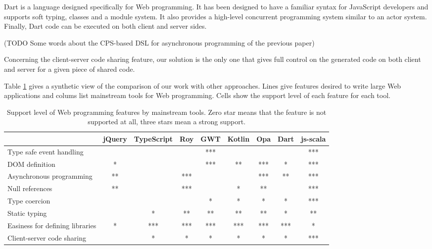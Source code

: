\documentclass[american,english,runningheads]{llncs}
\begin{document}
Dart is a language designed specifically for Web programming. It has been designed to have a familiar syntax for
JavaScript developers and supports soft typing, classes and a module system. It also provides a high-level concurrent
programming system similar to an actor system. Finally, Dart code can be executed on both client and server sides.

(TODO Some words about the CPS-based DSL for asynchronous programming of the previous paper)

Concerning the client-server code sharing feature, our solution is the only one that gives full control on the
generated code on both client and server for a given piece of shared code.

Table \ref{comparison} gives a synthetic view of the comparison of our work with other approaches. Lines give
features desired to write large Web applications and colums list mainstream tools for Web programming. Cells show the
support level of each feature for each tool.

\begin{table}
\centering
\begin{tabular}{| l | c | c | c | c | c | c | c | c |}
\hline
& jQuery & TypeScript & Roy & GWT & Kotlin & Opa & Dart & js-scala \\
\hline
Type safe event handling & & & & *** & & & & *** \\
\hline
DOM definition & * & & & *** & ** & *** & * & *** \\
\hline
Asynchronous programming & ** & & *** & & & *** & ** & *** \\
\hline
Null references & ** & & *** & & * & ** & & *** \\
\hline
Type coercion & & & & * & * & * & * & *** \\
\hline
Static typing & & * & ** & ** & ** & ** & * & ** \\
\hline
Easiness for defining libraries & * & *** & *** & *** & *** & *** & *** & * \\
\hline
Client-server code sharing & & * & * & * & * & *  & * & *** \\
\hline
\end{tabular}
\caption{Support level of Web programming features by mainstream tools. Zero star means that the feature is not supported
at all, three stars mean a strong support.}
\label{comparison}
\end{table}
\end{document}
